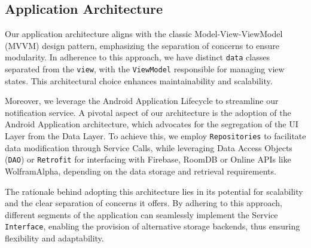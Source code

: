 \subsection{Application Architecture}\label{application_architecture}

Our application architecture aligns with the classic Model-View-ViewModel (MVVM) design pattern, emphasizing the separation of concerns to ensure modularity. In adherence to this approach, we have distinct \texttt{data} classes separated from the \texttt{view}, with the \texttt{ViewModel} responsible for managing view states. This architectural choice enhances maintainability and scalability.

Moreover, we leverage the Android Application Lifecycle to streamline our notification service. A pivotal aspect of our architecture is the adoption of the Android Application architecture, which advocates for the segregation of the UI Layer from the Data Layer. To achieve this, we employ \texttt{Repositories} to facilitate data modification through Service Calls, while leveraging Data Access Objects (\texttt{DAO}) or \texttt{Retrofit} for interfacing with Firebase, RoomDB or Online APIs like WolframAlpha, depending on the data storage and retrieval requirements.

The rationale behind adopting this architecture lies in its potential for scalability and the clear separation of concerns it offers. By adhering to this approach, different segments of the application can seamlessly implement the Service \texttt{Interface}, enabling the provision of alternative storage backends, thus ensuring flexibility and adaptability.

